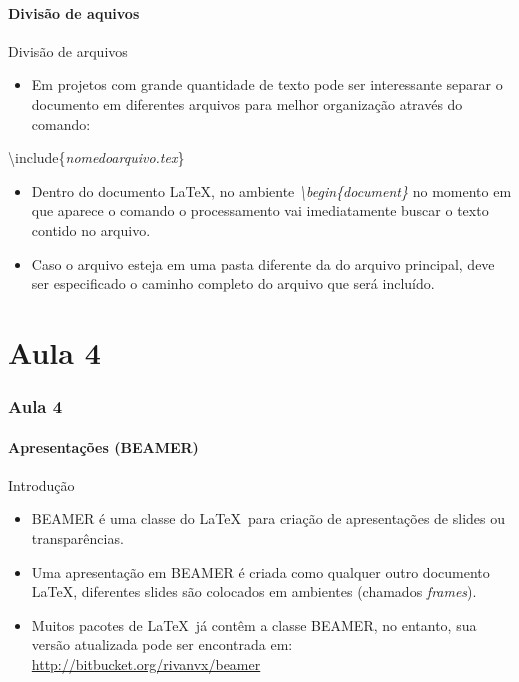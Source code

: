 \documentclass{beamer}
\begin{document}
\subsection{Divisão de aquivos}
\begin{frame}{Divisão de arquivos}

    \begin{itemize}
    \item Em projetos com grande quantidade de texto pode ser interessante separar o documento em diferentes arquivos para melhor organização através do comando:    
    \end{itemize}

    \alert{\textbackslash include\{\textit{nomedoarquivo.tex}\}}

    \begin{itemize}
     \item Dentro do documento \LaTeX, no ambiente \textit{\textbackslash begin\{document\}} no momento em que aparece o comando o processamento vai imediatamente buscar o texto contido no arquivo.
    \end{itemize}

    \begin{itemize}
     \item Caso o arquivo esteja em uma pasta diferente da do arquivo principal, deve ser especificado o caminho completo do arquivo que será incluído.
    \end{itemize}

\end{frame}





\part{Aula 4}
\section{Aula 4}

\subsection{Apresentações (BEAMER)}

\begin{frame}[fragile]{Introdução}
    \begin{itemize}
    \item {\footnotesize BEAMER} é uma classe do \LaTeX\ para criação de apresentações de slides ou transparências.
    \item Uma apresentação em {\footnotesize BEAMER} é criada como qualquer outro documento \LaTeX, diferentes slides são colocados em ambientes (chamados \textit{frames}).
    \item Muitos pacotes de \LaTeX\ já contêm a classe {\footnotesize BEAMER}, no entanto, sua versão atualizada pode ser encontrada em: \url{http://bitbucket.org/rivanvx/beamer}
    \end{itemize}
\end{frame}
\end{document}

